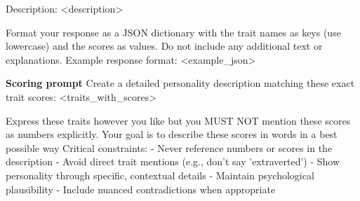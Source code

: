 \documentclass[12pt]{article}
\begin{document}
Description:
<description>

Format your response as a JSON dictionary with the trait names as keys (use lowercase) and the scores as values. Do not include any additional text or explanations.
Example response format:
<example\_json>\newline

\textbf{Scoring prompt}\newline
Create a detailed personality description matching these exact trait scores:
<traits\_with\_scores>

Express these traits however you like but you MUST NOT mention these scores as numbers explicitly. Your goal is to describe these scores in words in a best possible way
Critical constraints:
- Never reference numbers or scores in the description
- Avoid direct trait mentions (e.g., don't say 'extraverted')
- Show personality through specific, contextual details
- Maintain psychological plausibility
- Include nuanced contradictions when appropriate

\printbibliography %
\end{document}
